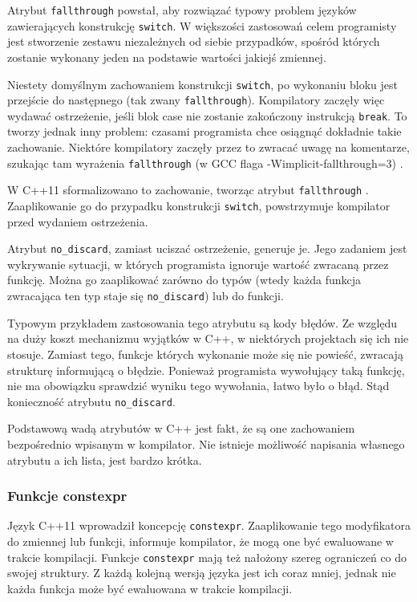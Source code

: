 Atrybut \lstinline{fallthrough} powstał, aby rozwiązać typowy problem języków zawierających konstrukcję \lstinline{switch}. W większości zastosowań celem programisty jest stworzenie zestawu niezależnych od siebie przypadków, spośród których zostanie wykonany jeden na podstawie wartości jakiejś zmiennej.\par
Niestety domyślnym zachowaniem konstrukcji \lstinline{switch}, po wykonaniu bloku jest przejście do następnego (tak zwany \lstinline{fallthrough}). Kompilatory zaczęły więc wydawać ostrzeżenie, jeśli blok case nie zostanie zakończony instrukcją \lstinline{break}. To tworzy jednak inny problem: czasami programista chce osiągnąć dokładnie takie zachowanie. Niektóre kompilatory zaczęły przez to zwracać uwagę na komentarze, szukając tam wyrażenia \lstinline{fallthrough} (w GCC flaga -Wimplicit-fallthrough=3) \cite{gcc_warnings}.\par
W C++11 sformalizowano to zachowanie, tworząc atrybut \lstinline{fallthrough} \cite{ISO:2012:III}. Zaaplikowanie go do przypadku konstrukcji \lstinline{switch}, powstrzymuje kompilator przed wydaniem ostrzeżenia.\par
Atrybut \lstinline{no_discard}, zamiast uciszać ostrzeżenie, generuje je. Jego zadaniem jest wykrywanie sytuacji, w których programista ignoruje wartość zwracaną przez funkcję. Można go zaaplikować zarówno do typów (wtedy każda funkcja zwracająca ten typ staje się \lstinline{no_discard}) lub do funkcji.\par
Typowym przykładem zastosowania tego atrybutu są kody błędów. Ze względu na duży koszt mechanizmu wyjątków w C++, w niektórych projektach się ich nie stosuje. Zamiast tego, funkcje których wykonanie może się nie powieść, zwracają strukturę informującą o błędzie. Ponieważ programista wywołujący taką funkcję, nie ma obowiązku sprawdzić wyniku tego wywołania, łatwo było o błąd. Stąd konieczność atrybutu \lstinline{no_discard}.

Podstawową wadą atrybutów w C++ jest fakt, że są one zachowaniem bezpośrednio wpisanym w kompilator. Nie istnieje możliwość napisania własnego atrybutu a ich lista, jest bardzo krótka.\par
\subsubsection{Funkcje constexpr}
Język C++11 wprowadził koncepcję \lstinline{constexpr}\cite{ISO:2012:III}.
Zaaplikowanie tego modyfikatora do zmiennej lub funkcji, informuje kompilator, że mogą one być ewaluowane w trakcie kompilacji. Funkcje \lstinline{constexpr} mają też nałożony szereg ograniczeń co do swojej struktury. Z każdą kolejną wersją języka jest ich coraz mniej, jednak nie każda funkcja może być ewaluowana w trakcie kompilacji.

